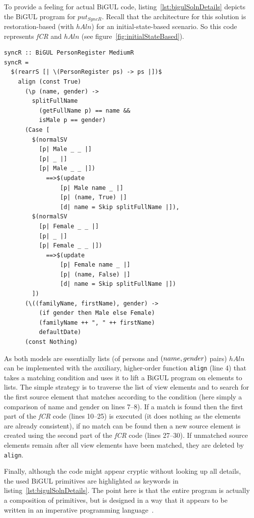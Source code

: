To provide a feeling for actual BiGUL code, listing~\ref{lst:bigulSolnDetails} depicts the BiGUL program for $put_{SyncR}$.
Recall that the architecture for this solution is restoration-based (with $\mathit{hAln}$) for an initial-state-based scenario.
So this code represents \emph{fCR} and $\mathit{hAln}$ (see figure~\ref{fig:initialStateBased}).


\begin{lstlisting}[label={lst:bigulSolnDetails}, float=htb!, language=bigul, caption={Structure of a BiGUL program}]
syncR :: BiGUL PersonRegister MediumR
syncR =
  $(rearrS [| \(PersonRegister ps) -> ps |])$
    align (const True)
      (\p (name, gender) -> 
        splitFullName 
          (getFullName p) == name &&
          isMale p == gender)
      (Case [ 
        $(normalSV 
          [p| Male _ _ |] 
          [p| _ |] 
          [p| Male _ _ |])
            ==>$(update 
                [p| Male name _ |] 
                [p| (name, True) |] 
                [d| name = Skip splitFullName |]),
        $(normalSV 
          [p| Female _ _ |] 
          [p| _ |] 
          [p| Female _ _ |])
            ==>$(update 
                [p| Female name _ |] 
                [p| (name, False) |] 
                [d| name = Skip splitFullName |])
        ])
      (\((familyName, firstName), gender) ->
          (if gender then Male else Female) 
          (familyName ++ ", " ++ firstName) 
          defaultDate)
      (const Nothing)
\end{lstlisting}

As both models are essentially lists (of persons and $(name,\- gender)$ pairs) $\mathit{hAln}$ can be implemented with the auxiliary, higher-order function \texttt{align} (line 4) that takes a matching condition and uses it to lift a BiGUL program on elements to lists.
The simple strategy is to traverse the list of view elements and to search for the first source element that matches according to the condition (here simply a comparison of name and gender on lines 7--8).
If a match is found then the first part of the \emph{fCR} code (lines 10--25) is executed (it does nothing as the elements are already consistent), if no match can be found then a new source element is created using the second part of the \emph{fCR} code (lines 27--30).
If unmatched source elements remain after all view elements have been matched, they are deleted by \texttt{align}.

Finally, although the code might appear cryptic without looking up all details, the used BiGUL primitives are highlighted as keywords in listing~\ref{lst:bigulSolnDetails}.
The point here is that the entire program is actually a composition of primitives, but is designed in a way that it appears to be written in an imperative programming language~\cite{POPL2018-Ko}.

